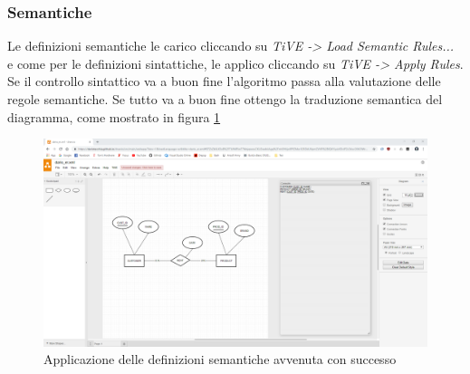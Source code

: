             \subsubsection{Semantiche}
                Le definizioni semantiche le carico cliccando su  \textit{TiVE -> Load Semantic Rules...} e come per le definizioni sintattiche, le applico cliccando su \textit{TiVE -> Apply Rules}.
                \newline
                Se il controllo sintattico va a buon fine l'algoritmo passa alla valutazione delle regole semantiche. Se tutto va a buon fine ottengo la traduzione semantica del diagramma, come mostrato in figura \ref{fig:semanticOK}
                \begin{figure}[htbp]
                    \centering
                    \includegraphics[scale=0.2]{Figure/drawse/semanticOK.PNG}
                    \caption{Applicazione delle definizioni semantiche avvenuta con successo}
                    \label{fig:semanticOK}
                \end{figure}